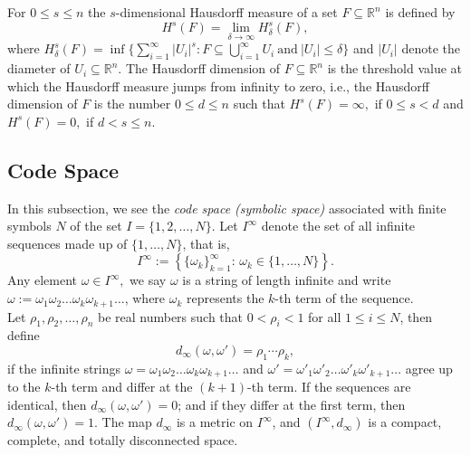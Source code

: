 \documentclass[12pt,oneside,reqno]{amsart}
\theoremstyle{definition}
\theoremstyle{remark}
\begin{document}
For $0\le s \le n$ the $s$-dimensional Hausdorff measure of a set $F \subseteq \mathbb{R}^n$ is defined by 
$$H^s(F)= \lim_{\delta \to \infty} H^s_\delta(F),$$
where $H^s_\delta(F)= \inf\big\{\sum_{i=1}^{\infty} |U_i|^s : F \subseteq \bigcup_{i=1}^{\infty} U_i ~\text{and}~ |U_i| \le \delta\big\}$ and $|U_i|$ denote the diameter of $U_i \subseteq \mathbb{R}^n.$
The Hausdorff dimension of $F \subseteq \mathbb{R}^n$ is the threshold value at which the Hausdorff measure jumps from infinity to zero, i.e., the Hausdorff dimension of $F$ is the number $0 \le d \le n$ such that $H^s(F)= \infty,$ if $0 \le s < d$ and $H^s(F)=0,$ if $d <s \le n.$
\subsection{Code Space}
In this subsection, we see the \emph{code space (symbolic space)} associated with finite symbols $N$ of the set $I = \{1,2,\ldots, N\}$.
 Let $I^\infty$ denote the set of all infinite sequences made up of $\{1, \ldots, N\}$, that is,
\[
I^\infty := \left\{ \{\omega_k\}_{k=1}^{\infty} :\, \omega_k \in \{1, \ldots, N\} \right\}.
\]
Any element $\omega \in I^\infty,$ we say $\omega$ is a string of length infinite and write $\omega := \omega_1 \omega_2 \dots \omega_k \omega_{k+1} \dots$, where $\omega_k$ represents the $k$-th term of the sequence.\\
Let $\rho_1, \rho_2,\ldots,\rho_n$ be real numbers such that $0< \rho_i <1$ for all $1 \le i \le N$, then define 
$$d_\infty(\omega, \omega')= \rho_1 \cdots \rho_k,$$
if the infinite strings $\omega = \omega_1 \omega_2 \dots \omega_k \omega_{k+1} \dots$ and $\omega' = \omega'_1 \omega'_2 \dots \omega'_k \omega'_{k+1} \dots$ agree up to the $k$-th term and differ at the $(k+1)$-th term. If the sequences are identical, then $d_\infty(\omega,\omega') = 0$; and if they differ at the first term, then $d_\infty(\omega, \omega') = 1$. The map $d_\infty$ is a metric on $I^\infty$, and $(I^\infty, d_\infty)$ is a compact, complete, and totally disconnected space. \\
\end{document}
